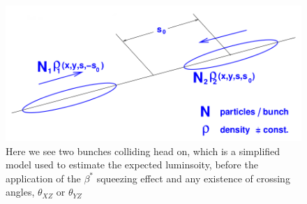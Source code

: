 \begin{figure}
\begin{center}
\includegraphics[width=\linewidth,height=\textheight,keepaspectratio]{./figures/simple_bunch_head_on}
\caption{ 
Here we see two bunches colliding head on, which is a simplified model used to
estimate the expected luminsoity, before the application of the $\beta^{*}$
squeezing effect and any existence of crossing angles, $\theta_{XZ}$ or
$\theta_{YZ}$ 
}
\label{fig:simple_bunch_head_on}
\end{center}
\end{figure}
